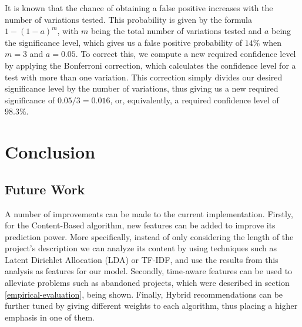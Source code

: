 \documentclass[cic,tc,english]{iiufrgs}
\begin{document}
It is known that the chance of obtaining a false positive increases with the number of variations tested. This probability is given by the formula $1-(1-a)^m$, with $m$ being the total number of variations tested and $a$ being the significance level, which gives us a false positive probability of $14\%$ when $m=3$ and $a=0.05$. To correct this, we compute a new required confidence level by applying the Bonferroni correction, which calculates the confidence level for a test with more than one variation. This correction simply divides our desired significance level by the number of variations,  thus giving us a new required significance of $0.05/3=0.016$, or, equivalently, a required confidence level of $98.3\%$.
\chapter{Conclusion}
\section{Future Work}
A number of improvements can be made to the current implementation. Firstly, for the Content-Based algorithm, new features can be added to improve its prediction power. More specifically, instead of only considering the length of the project's description we can analyze its content by using techniques such as Latent Dirichlet Allocation (LDA) or TF-IDF, and use the results from this analysis as features for our model. Secondly, time-aware features can be used to alleviate problems such as abandoned projects, which were described in section \ref{empirical-evaluation}, being shown. Finally, Hybrid recommendations can be further tuned by giving different weights to each algorithm, thus placing a higher emphasis in one of them.


{}
\end{document}
